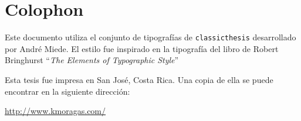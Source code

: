 
\pagestyle{empty}

\hfill

\vfill


\section*{Colophon}

Este documento utiliza el conjunto de tipografías de \texttt{classicthesis} desarrollado por Andr\'e Miede. El estilo fue inspirado en la tipografía del libro de Robert Bringhurst ``\emph{The Elements of Typographic Style}''

\noindent Esta tesis fue impresa en San José, Costa Rica. Una copia de ella se puede encontrar en la siguiente dirección:

\begin{center}
\url{http://www.kmoragas.com/}
\end{center}
 
\bigskip

\noindent\finalVersionString